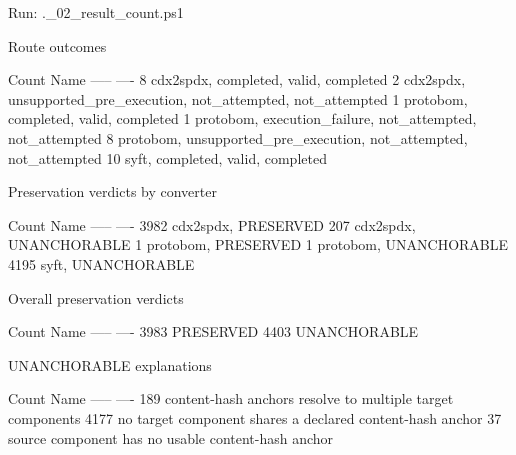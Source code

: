 Run: .\freeze_02_result_count.ps1

Route outcomes

Count Name
----- ----
    8 cdx2spdx, completed, valid, completed
    2 cdx2spdx, unsupported_pre_execution, not_attempted, not_attempted
    1 protobom, completed, valid, completed
    1 protobom, execution_failure, not_attempted, not_attempted
    8 protobom, unsupported_pre_execution, not_attempted, not_attempted
   10 syft, completed, valid, completed


Preservation verdicts by converter

Count Name
----- ----
 3982 cdx2spdx, PRESERVED
  207 cdx2spdx, UNANCHORABLE
    1 protobom, PRESERVED
    1 protobom, UNANCHORABLE
 4195 syft, UNANCHORABLE


Overall preservation verdicts

Count Name
----- ----
 3983 PRESERVED
 4403 UNANCHORABLE


UNANCHORABLE explanations

Count Name
----- ----
  189 content-hash anchors resolve to multiple target components
 4177 no target component shares a declared content-hash anchor
   37 source component has no usable content-hash anchor
